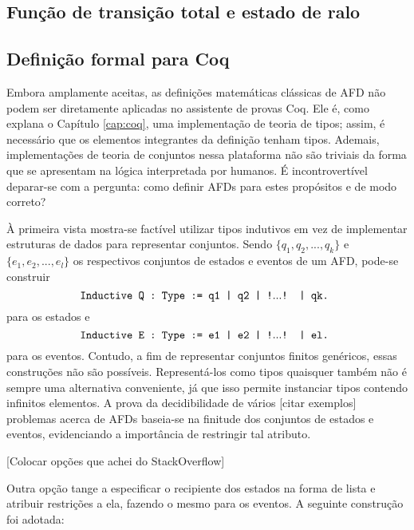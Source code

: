 \subsection{Função de transição total e estado de ralo}

\subsection{Definição formal para Coq}

Embora amplamente aceitas, as definições matemáticas clássicas de AFD não podem ser diretamente aplicadas no assistente de provas Coq. Ele é, como explana o Capítulo \ref{cap:coq}, uma implementação de teoria de tipos; assim, é necessário que os elementos integrantes da definição tenham tipos. Ademais, implementações de teoria de conjuntos nessa plataforma não são triviais da forma que se apresentam na lógica interpretada por humanos. É incontrovertível deparar-se com a pergunta: como definir AFDs para estes propósitos e de modo correto?

À primeira vista mostra-se factível utilizar tipos indutivos em vez de implementar estruturas de dados para representar conjuntos. Sendo $\{ q_1, q_2, ..., q_k \}$ e $\{ e_1, e_2, ..., e_l \}$ os respectivos conjuntos de estados e eventos de um AFD, pode-se construir
\begin{equation}\text{\texttt{
Inductive Q : Type := q1 | q2 | !$...$! | qk.
}}\label{eq:Q_inductive}
\end{equation}
para os estados e
\begin{equation}\text{\texttt{
Inductive E : Type := e1 | e2 | !$...$! | el.
}}\label{eq:E_inductive}\end{equation}
para os eventos. Contudo, a fim de representar conjuntos finitos genéricos, essas construções não são possíveis. Representá-los como tipos quaisquer também não é sempre uma alternativa conveniente, já que isso permite instanciar tipos contendo infinitos elementos. A prova da decidibilidade de vários [citar exemplos] problemas acerca de AFDs baseia-se na finitude dos conjuntos de estados e eventos, evidenciando a importância de restringir tal atributo.



[Colocar opções que achei do StackOverflow]

Outra opção tange a especificar o recipiente dos estados na forma de lista e atribuir restrições a ela, fazendo o mesmo para os eventos. A seguinte construção foi adotada:

